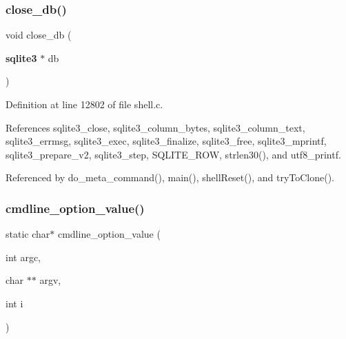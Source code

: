 \subsubsection{close\+\_\+db()}
{\footnotesize\ttfamily void close\+\_\+db (\begin{DoxyParamCaption}\item[{\textbf{ sqlite3} $\ast$}]{db }\end{DoxyParamCaption})}



Definition at line 12802 of file shell.\+c.



References sqlite3\+\_\+close, sqlite3\+\_\+column\+\_\+bytes, sqlite3\+\_\+column\+\_\+text, sqlite3\+\_\+errmsg, sqlite3\+\_\+exec, sqlite3\+\_\+finalize, sqlite3\+\_\+free, sqlite3\+\_\+mprintf, sqlite3\+\_\+prepare\+\_\+v2, sqlite3\+\_\+step, S\+Q\+L\+I\+T\+E\+\_\+\+R\+OW, strlen30(), and utf8\+\_\+printf.



Referenced by do\+\_\+meta\+\_\+command(), main(), shell\+Reset(), and try\+To\+Clone().


\mbox{\label{shell_8c_a22d588f7badcc45956201450a9307388}} 
\subsubsection{cmdline\+\_\+option\+\_\+value()}
{\footnotesize\ttfamily static char$\ast$ cmdline\+\_\+option\+\_\+value (\begin{DoxyParamCaption}\item[{int}]{argc,  }\item[{char $\ast$$\ast$}]{argv,  }\item[{int}]{i }\end{DoxyParamCaption})\hspace{0.3cm}{\ttfamily [static]}}




